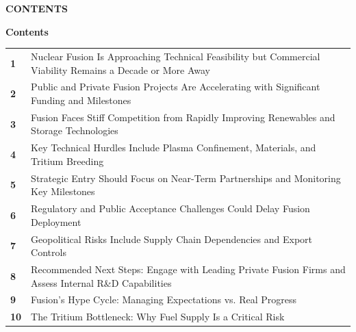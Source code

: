 \documentclass[10pt,a4paper]{article}
\begin{document}
{\textcolor{BOBlue}{\scriptsize\bfseries CONTENTS}}\par\vspace{-1pt}
{\Large\sffamily\bfseries\color{BONavy} Contents}\par\vspace{4pt}
\vspace{2pt}{\color{BOBright}\rule{\linewidth}{1pt}}\vspace{5pt}
\begin{tabularx}{\linewidth}{p{10mm}Y}
\textcolor{BOBlue}{\bfseries 1} & Nuclear Fusion Is Approaching Technical Feasibility but Commercial Viability Remains a Decade or More Away \\[5pt]
\textcolor{BOBlue}{\bfseries 2} & Public and Private Fusion Projects Are Accelerating with Significant Funding and Milestones \\[5pt]
\textcolor{BOBlue}{\bfseries 3} & Fusion Faces Stiff Competition from Rapidly Improving Renewables and Storage Technologies \\[5pt]
\textcolor{BOBlue}{\bfseries 4} & Key Technical Hurdles Include Plasma Confinement, Materials, and Tritium Breeding \\[5pt]
\textcolor{BOBlue}{\bfseries 5} & Strategic Entry Should Focus on Near-Term Partnerships and Monitoring Key Milestones \\[5pt]
\textcolor{BOBlue}{\bfseries 6} & Regulatory and Public Acceptance Challenges Could Delay Fusion Deployment \\[5pt]
\textcolor{BOBlue}{\bfseries 7} & Geopolitical Risks Include Supply Chain Dependencies and Export Controls \\[5pt]
\textcolor{BOBlue}{\bfseries 8} & Recommended Next Steps: Engage with Leading Private Fusion Firms and Assess Internal R\&D Capabilities \\[5pt]
\textcolor{BOBlue}{\bfseries 9} & Fusion's Hype Cycle: Managing Expectations vs. Real Progress \\[5pt]
\textcolor{BOBlue}{\bfseries 10} & The Tritium Bottleneck: Why Fuel Supply Is a Critical Risk \\[5pt]
\end{tabularx}
\clearpage
\end{document}
